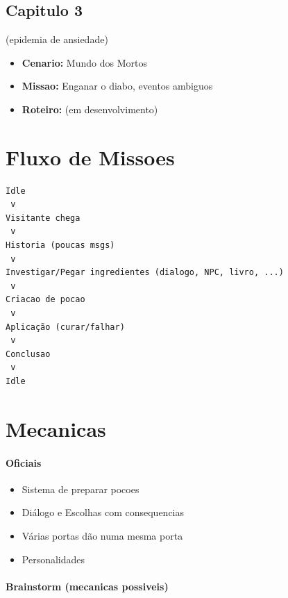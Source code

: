 \documentclass[12pt]{article}
\begin{document}
\subsection{Capitulo 3}

(epidemia de ansiedade)

\begin{itemize}[leftmargin=*]
    \item \textbf{Cenario:} Mundo dos Mortos
    \item \textbf{Missao:} Enganar o diabo, eventos ambiguos
    \item \textbf{Roteiro:} (em desenvolvimento)
\end{itemize}

\newpage

\section{Fluxo de Missoes}

\begin{verbatim}
Idle
 v
Visitante chega
 v
Historia (poucas msgs)
 v
Investigar/Pegar ingredientes (dialogo, NPC, livro, ...)
 v
Criacao de pocao
 v
Aplicação (curar/falhar)
 v
Conclusao
 v
Idle
\end{verbatim}


\newpage
\section{Mecanicas}

\paragraph{Oficiais}

\begin{itemize}
    \item Sistema de preparar pocoes
    \item Diálogo e Escolhas com consequencias
    \item Várias portas dão numa mesma porta
    \item Personalidades
\end{itemize}

\paragraph{Brainstorm (mecanicas possiveis)}
\end{document}
